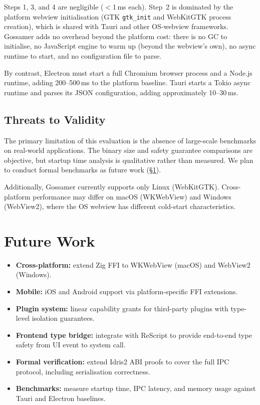 \documentclass[11pt,a4paper]{article}
\theoremstyle{definition}
\begin{document}
Steps 1, 3, and 4 are negligible ($<$1\,ms each). Step~2 is dominated
by the platform webview initialisation (GTK \texttt{gtk\_init} and
WebKitGTK process creation), which is shared with Tauri and other
OS-webview frameworks. Gossamer adds no overhead beyond the platform
cost: there is no GC to initialise, no JavaScript engine to warm up
(beyond the webview's own), no async runtime to start, and no
configuration file to parse.

By contrast, Electron must start a full Chromium browser process and
a Node.js runtime, adding 200--500\,ms to the platform baseline.
Tauri starts a Tokio async runtime and parses its JSON configuration,
adding approximately 10--30\,ms.

\subsection{Threats to Validity}

The primary limitation of this evaluation is the absence of
large-scale benchmarks on real-world applications. The binary size
and safety guarantee comparisons are objective, but startup time
analysis is qualitative rather than measured. We plan to conduct
formal benchmarks as future work (\S\ref{sec:future}).

Additionally, Gossamer currently supports only Linux (WebKitGTK).
Cross-platform performance may differ on macOS (WKWebView) and
Windows (WebView2), where the OS webview has different cold-start
characteristics.

\section{Future Work}
\label{sec:future}

\begin{itemize}[nosep]
  \item \textbf{Cross-platform:} extend Zig FFI to WKWebView (macOS)
    and WebView2 (Windows).
  \item \textbf{Mobile:} iOS and Android support via platform-specific
    FFI extensions.
  \item \textbf{Plugin system:} linear capability grants for third-party
    plugins with type-level isolation guarantees.
  \item \textbf{Frontend type bridge:} integrate with ReScript to
    provide end-to-end type safety from UI event to system call.
  \item \textbf{Formal verification:} extend Idris2 ABI proofs to cover
    the full IPC protocol, including serialisation correctness.
  \item \textbf{Benchmarks:} measure startup time, IPC latency, and
    memory usage against Tauri and Electron baselines.
\end{itemize}
\end{document}
